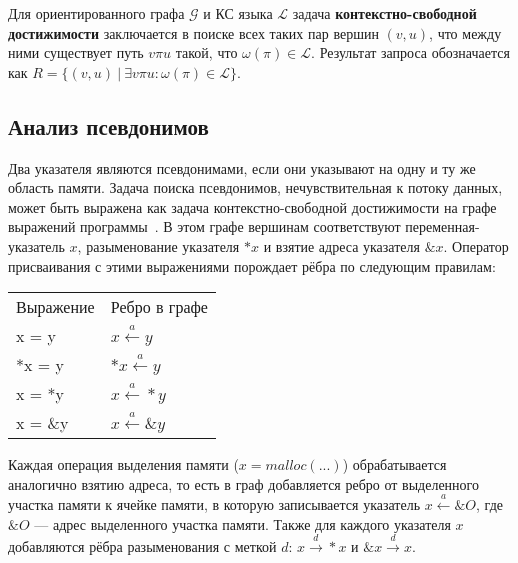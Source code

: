 Для ориентированного графа $\mathcal{G}$ и КС языка $\mathcal{L}$ задача \textbf{контекстно-свободной достижимости} заключается в поиске всех таких пар вершин $(v,u)$, что между ними существует путь $v \pi u$ такой, что $\omega (\pi) \in \mathcal{L}$. Результат запроса обозначается как ${R = \{ (v,u)~|~\exists v \pi u : \omega (\pi) \in \mathcal{L} \}}$.


\subsection{Анализ псевдонимов} 

Два указателя являются псевдонимами, если они указывают на одну и ту же область памяти. Задача поиска псевдонимов, нечувствительная к потоку данных, может быть выражена как задача контекстно-свободной достижимости на графе выражений программы~\cite{demand_driven_alias_analysis}. В этом графе вершинам соответствуют переменная-указатель $x$, разыменование указателя $*x$ и взятие адреса указателя $\&x$. Оператор присваивания с этими выражениями порождает рёбра по следующим правилам:

\begin{table}[H]
    \centering
    \begin{tabular}{ll}
        Выражение & Ребро в графе \\
        x = y & $x \xleftarrow{a} y$ \\
        *x = y & $*x \xleftarrow{a} y$ \\
        x = *y & $x \xleftarrow{a} *y$ \\
        x = \&y & $x \xleftarrow{a} \&y$ \\
    \end{tabular}
\end{table}

Каждая операция выделения памяти ($x=malloc(...)$) обрабатывается аналогично взятию адреса, то есть в граф добавляется ребро от выделенного участка памяти к ячейке памяти, в которую записывается указатель $x \xleftarrow{a} \&O$, где $\&O$ --- адрес выделенного участка памяти. Также для каждого указателя $x$ добавляются рёбра разыменования с меткой $d$: $x \xrightarrow{d} *x$ и $\&x \xrightarrow{d} x$.

